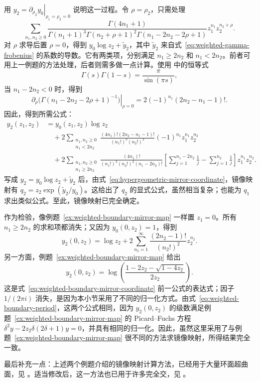 \begin{example}
用 $y_2=\left.\partial_{\rho_2}y_0\right|_{\rho_1=\rho_2=0}$ 说明这一过程。令 $\rho=\rho_2$，只需处理
\begin{equation}\label{eq:weighted-gamma-frobenius}
\sum_{n_1,n_2\geq0}
\frac{\Gamma(4n_1+1)}
{\Gamma(n_1+1)^3\Gamma(n_2+\rho+1)^2\Gamma(n_1-2n_2-2\rho+1)}
z_1^{n_1}z_2^{n_2+\rho}.
\end{equation}
对 $\rho$ 求导后置 $\rho=0$，得到 $y_0\log z_2+\widetilde y_2$，其中 $\widetilde y_2$ 来自式~\eqref{eq:weighted-gamma-frobenius} 的系数的导数。它有两类项，分别满足 $n_1\geq2n_2$ 和 $n_1<2n_2$。前者可用上一例题的方法处理，后者则需多做一点计算。使用  中的恒等式
\[
\Gamma(s)\Gamma(1-s)=\frac\pi{\sin(\pi s)},
\]
当 $n_1-2n_2<0$ 时，得到
\[
\left.\partial_\rho\bigl(\Gamma(n_1-2n_2-2\rho+1)^{-1}\bigr)\right|_{\rho=0}
=2(-1)^{n_1}(2n_2-n_1-1)!.
\]
因此，得到所需公式：
\[
\begin{aligned}
y_2(z_1,z_2)
&=y_0(z_1,z_2)\log z_2\\
&\quad+2\sum_{\substack{n_1,n_2\geq0\\n_1<2n_2}}
\frac{(4n_1)!(2n_2-n_1-1)!}{(n_1!)^3(n_2!)^2}
(-1)^{n_1}z_1^{n_1}z_2^{n_2}\\
&\quad+2\sum_{\substack{n_1,n_2\geq0\\n_1\geq2n_2}}
\frac{(4n_1)!}{(n_1!)^3(n_2!)^2(n_1-2n_2)!}
\left[\sum_{j=1}^{n_1-2n_2}\frac1j-\sum_{j=1}^{n_2}\frac1j\right]
z_1^{n_1}z_2^{n_2}.
\end{aligned}
\]
写成 $y_2=y_0\log z_2+\widetilde y_2$ 后，由式~\eqref{eq:hypergeometric-mirror-coordinate}，镜像映射有 $q_2=z_2\exp(\widetilde y_2/y_0)$。这给出了 $q_2$ 的显式公式，虽然相当复杂；也能为 $q_1$ 求出类似公式。至此，镜像映射已完全确定。

作为检验，像例题~\ref{ex:weighted-boundary-mirror-map} 一样置 $z_1=0$。所有 $n_1\geq2n_2$ 的求和项都消失；又因为 $y_0(0,z_2)=1$，得到
\begin{equation}\label{eq:weighted-boundary-log-series}
y_2(0,z_2)=\log z_2+
2\sum_{n_2=1}^\infty\frac{(2n_2-1)!}{(n_2!)^2}z_2^{n_2}.
\end{equation}
另一方面，例题~\ref{ex:weighted-boundary-mirror-map} 给出
\begin{equation}\label{eq:weighted-boundary-log-closed}
y_2(0,z_2)=\log\left(\frac{1-2z_2-\sqrt{1-4z_2}}{2z_2}\right).
\end{equation}
这是式~\eqref{eq:weighted-boundary-mirror-coordinate} 前一公式的表达式；因子 $1/(2\pi i)$ 消失，是因为本小节采用了不同的归一化方式。由式~\eqref{eq:weighted-boundary-period}，这两个公式相同，因为 $y_2(0,z_2)$ 的级数满足例题~\ref{ex:weighted-boundary-mirror-map} 的 Picard--Fuchs 方程
$\delta^2y-2z_2\delta(2\delta+1)y=0$，并具有相同的归一化。因此，虽然这里采用了与例题~\ref{ex:weighted-boundary-mirror-map} 很不同的方法求镜像映射，所得结果完全一致。
\end{example}

最后补充一点：上述两个例题介绍的镜像映射计算方法，已经用于大量环面超曲面，见 。适当修改后，这一方法也已用于许多完全交，见 。
